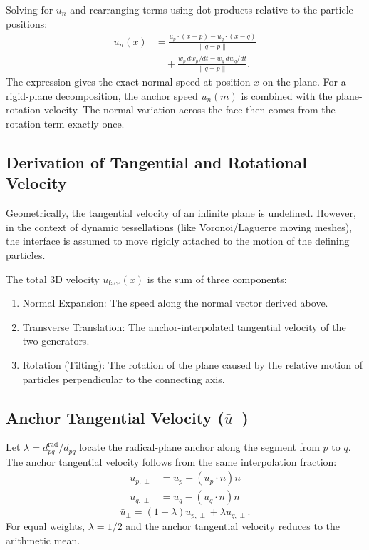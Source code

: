 \documentclass[twocolumn]{aastex63}
\begin{document}
Solving for $u_n$ and rearranging terms using dot products relative to the particle positions:
\begin{equation}
    \begin{aligned}
    u_n({x})&=\frac{{u}_p\cdot({x}-{p})-{u}_q\cdot({x}-{q})}{\|q-p\|}\\
    &\quad+\frac{w_p\,dw_p/dt-w_q\,dw_q/dt}{\|q-p\|}.
    \end{aligned}
\end{equation}
The expression gives the exact normal speed at position $x$ on the plane.
For a rigid-plane decomposition, the anchor speed $u_n(m)$ is combined with
the plane-rotation velocity. The normal variation across the face then comes
from the rotation term exactly once.

\subsection{Derivation of Tangential and Rotational Velocity}

Geometrically, the tangential velocity of an infinite plane is undefined. However, in the context of dynamic tessellations (like Voronoi/Laguerre moving meshes), the interface is assumed to move rigidly attached to the motion of the defining particles.

The total 3D velocity $u_\textrm{face}({x})$ is the sum of three components:
\begin{enumerate}
    \item {Normal Expansion:} The speed along the normal vector derived above.
    \item {Transverse Translation:} The anchor-interpolated tangential velocity of the two generators.
    \item {Rotation (Tilting):} The rotation of the plane caused by the relative motion of particles perpendicular to the connecting axis.
\end{enumerate}

\subsection{Anchor Tangential Velocity (${\bar{u}}_{\perp}$)}
Let $\lambda=d_{pq}^\textrm{rad}/d_{pq}$ locate the radical-plane anchor
along the segment from $p$ to $q$. The anchor tangential velocity follows
from the same interpolation fraction:
\begin{align}
    {u}_{p,\perp} &= {u}_p - ({u}_p \cdot {n}){n} \\
    {u}_{q,\perp} &= {u}_q - ({u}_q \cdot {n}){n}
\end{align}
\begin{equation}
    {\bar{u}}_{\perp} = (1-\lambda){u}_{p,\perp}+\lambda {u}_{q,\perp}.
\end{equation}
For equal weights, $\lambda=1/2$ and the anchor tangential velocity reduces
to the arithmetic mean.
\end{document}
